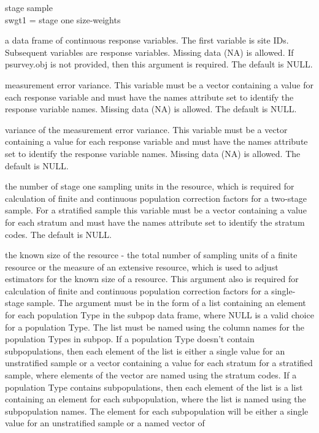 \begin{Arguments}
\begin{ldescription}
stage sample\\
swgt1 = stage one size-weights
\item[\code{data.cont}] a data frame of continuous response variables.  The first 
variable is site IDs.  Subsequent variables are response variables.
Missing data (NA) is allowed.  If psurvey.obj is not provided, then
this argument is required.  The default is NULL.
\item[\code{sigma}] measurement error variance.  This variable must be a vector
containing a value for each response variable and must have the names
attribute set to identify the response variable names.  Missing data (NA)
is allowed.  The default is NULL.
\item[\code{var.sigma}] variance of the measurement error variance.  This variable
must be a vector containing a value for each response variable and must have
the names attribute set to identify the response variable names.  Missing
data (NA) is allowed.  The default is NULL.
\item[\code{N.cluster}] the number of stage one sampling units in the resource, which 
is required for calculation of finite and continuous population 
correction factors for a two-stage sample.  For a stratified sample 
this variable must be a vector containing a value for each stratum and
must have the names attribute set to identify the stratum codes.  The
default is NULL.
\item[\code{popsize}] the known size of the resource - the total number of sampling 
units of a finite resource or the measure of an extensive resource,
which is used to adjust estimators for the known size of a resource.
This argument also is required for calculation of finite and
continuous population correction factors for a single-stage sample.   
The argument must be in the form of a list containing an element for   
each population Type in the subpop data frame, where NULL is a valid   
choice for a population Type.  The list must be named using the column  
names for the population Types in subpop. If a population Type doesn't  
contain subpopulations, then each element of the list is either a  
single value for an unstratified sample or a vector containing a value  
for each stratum for a stratified sample, where elements of the vector
are named using the stratum codes.  If a population Type contains 
subpopulations, then each element of the list is a list containing an 
element for each subpopulation, where the list is named using the 
subpopulation names.  The element for each subpopulation will be 
either a single value for an unstratified sample or a named vector of 

\end{ldescription}
\end{Arguments}

